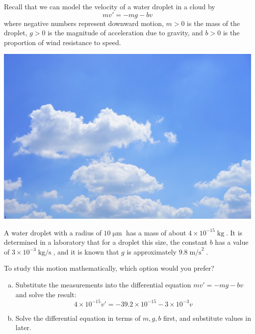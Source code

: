 

\begin{applicationActivities}



\begin{observation}
Recall that we can model the velocity of a water droplet in a cloud by
\[mv'=-mg-bv\]
where negative numbers represent downward motion,
\(m>0\) is the mass of the droplet, 
\(g>0\) is the magnitude of acceleration due to gravity, and 
\(b>0\) is the proportion of wind resistance to speed.
\begin{center}
\includegraphics[scale=0.2]{media/cloud.jpg}
\end{center}
\end{observation}

\begin{activity}{5}
A water droplet with a radius of \(10\operatorname{\mu m}\) has a mass of about \(4 \times 10^{-15}\operatorname{kg}\).  
It is determined in a laboratory that for a droplet this size, the constant \(b\) has a value of \(3\times 10^{-3}\operatorname{kg/s}\),
and it is known that \(g\) is approximately \(9.8\operatorname{m/s}^2\).

\vfill

To study this motion mathematically, which option would you prefer?
\begin{enumerate}[a)]
\item Substitute the measurements into the differential equation \(mv'=-mg-bv\) and solve the result:
\[4\times 10^{-15}v'=-39.2\times 10^{-15}-3\times 10^{-3}v \]
\item Solve the differential equation in terms of \(m,g,b\) first, and substitute values in later.
\end{enumerate}
\end{activity}


\end{applicationActivities}

